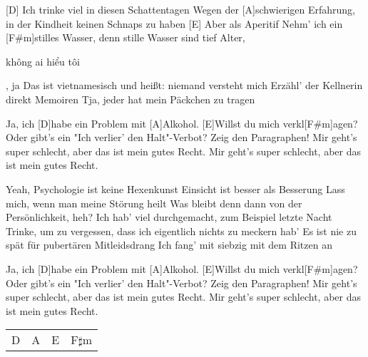 



\begin{guitar}
	[D] Ich trinke viel in diesen Schattentagen
	Wegen der [A]schwierigen Erfahrung, in der Kindheit keinen Schnaps zu haben
	[E] Aber als Aperitif
	Nehm' ich ein [F#m]stilles Wasser, denn stille Wasser sind tief
	Alter, \begin{otherlanguage}{vietnamese}không ai hiểu tôi\end{otherlanguage}, ja
	Das ist vietnamesisch und heißt: niemand versteht mich
	Erzähl' der Kellnerin direkt Memoiren
	Tja, jeder hat mein Päckchen zu tragen
	
	\begin{highlightbar}
		Ja, ich [D]habe ein Problem mit [A]Alkohol. [E]Willst du mich verkl[F#m]agen?
		Oder gibt's ein "Ich verlier' den Halt"\--Verbot? Zeig den Paragraphen!
		Mir geht's super schlecht, aber das ist mein gutes Recht.
		Mir geht's super schlecht, aber das ist mein gutes Recht.
	\end{highlightbar}
	
	\songsection{Strophe 2}
	Yeah, Psychologie ist keine Hexenkunst
	Einsicht ist besser als Besserung
	Lass mich, wenn man meine Störung heilt
	Was bleibt denn dann von der Persönlichkeit, heh?
	Ich hab' viel durchgemacht, zum Beispiel letzte Nacht
	Trinke, um zu vergessen, dass ich eigentlich nichts zu meckern hab'
	Es ist nie zu spät für pubertären Mitleidsdrang
	Ich fang' mit siebzig mit dem Ritzen an
	
	\begin{highlightbar}
		\songsection{Refrain}
		Ja, ich [D]habe ein Problem mit [A]Alkohol. [E]Willst du mich verkl[F#m]agen?
		Oder gibt's ein "Ich verlier' den Halt"\--Verbot? Zeig den Paragraphen!
		Mir geht's super schlecht, aber das ist mein gutes Recht.
		Mir geht's super schlecht, aber das ist mein gutes Recht.
	\end{highlightbar}
	
	 {\footnotesize\begin{tabular}{|l|l|l|l|}
			D & A & E & F$\sharp$m
	\end{tabular}}
	

\end{guitar}
